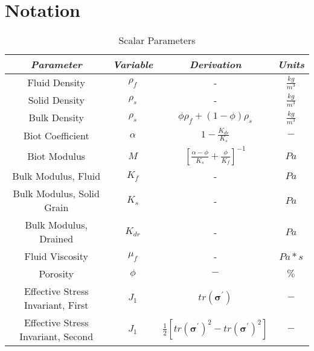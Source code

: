 \section{Notation}
\begin{table}[ht]
 \caption{Scalar Parameters}
 \centering
 \begin{tabular}{c | c | c | c}
  \hline\hline
  \textit{Parameter} & \textit{Variable}    & \textit{Derivation} & \textit{Units} \\ [0.75ex]\hline
Fluid Density                       & $\rho_{f}$        & -                                   & $\frac{kg}{m^{3}}$ \\ [0.5ex]\hline 
Solid Density                       & $\rho_{s}$        & -                                   & $\frac{kg}{m^{3}}$ \\ [0.5ex]\hline
Bulk Density                        & $\rho_{s}$        & $\phi\rho_{f} + (1-\phi)\rho_{s}$   & $\frac{kg}{m^{3}}$ \\ [0.5ex]\hline
Biot Coefficient                    & $\alpha$          & $1 - \frac{K_{dr}}{K_{s}}$          & $ - $ \\ [0.5ex]\hline
Biot Modulus                        & $M$               & $\left[\frac{\alpha - \phi}{K_{s}} + \frac{\phi}{K_{f}} \right]^{-1}$           & $Pa$ \\ [0.5ex]\hline
Bulk Modulus, Fluid                 & $K_{f}$           & -                                   & $ Pa $ \\ [0.5ex]\hline
Bulk Modulus, Solid Grain           & $K_{s}$           & -                                   & $ Pa $ \\ [0.5ex]\hline
Bulk Modulus, Drained               & $K_{dr}$          & -                                   & $ Pa $ \\ [0.5ex]\hline
Fluid Viscosity                     & $\mu_{f}$         & -                                   & $ Pa * s $ \\ [0.5ex]\hline  
Porosity                            & $\phi$            & $-$                                 & $\%$ \\ [0.5ex]\hline
Effective Stress Invariant, First   & $J_{1}$           & $tr(\bm{\sigma}^{'})$               & $ - $ \\ [0.5ex]\hline
Effective Stress Invariant, Second  & $J_{1}$           & $\frac{1}{2}\left[tr(\bm{\sigma}^{'})^{2} - tr(\bm{\sigma}^{'})^{2} \right]  $  & $ - $ \\ [0.5ex]\hline

\end{tabular}
\end{table}
